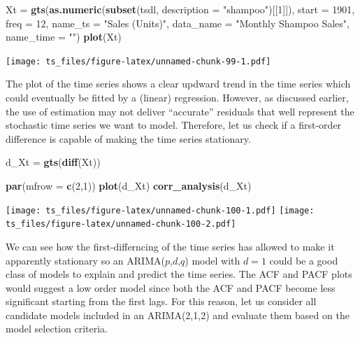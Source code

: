 \documentclass[]{book}
\newenvironment{Shaded}{\begin{snugshade}}{\end{snugshade}}
\newcommand{\KeywordTok}[1]{\textcolor[rgb]{0.13,0.29,0.53}{\textbf{#1}}}
\newcommand{\DataTypeTok}[1]{\textcolor[rgb]{0.13,0.29,0.53}{#1}}
\newcommand{\DecValTok}[1]{\textcolor[rgb]{0.00,0.00,0.81}{#1}}
\newcommand{\StringTok}[1]{\textcolor[rgb]{0.31,0.60,0.02}{#1}}
\newcommand{\NormalTok}[1]{#1}
\theoremstyle{definition}
\theoremstyle{definition}
\theoremstyle{definition}
\theoremstyle{remark}
\begin{document}
\begin{Shaded}
\begin{Highlighting}[]
\NormalTok{Xt =}\StringTok{ }\KeywordTok{gts}\NormalTok{(}\KeywordTok{as.numeric}\NormalTok{(}\KeywordTok{subset}\NormalTok{(tsdl, }\DataTypeTok{description =} \StringTok{"shampoo"}\NormalTok{)[[}\DecValTok{1}\NormalTok{]]), }\DataTypeTok{start =} \DecValTok{1901}\NormalTok{, }\DataTypeTok{freq =} \DecValTok{12}\NormalTok{, }\DataTypeTok{name_ts =} \StringTok{"Sales (Units)"}\NormalTok{, }\DataTypeTok{data_name =} \StringTok{"Monthly Shampoo Sales"}\NormalTok{, }\DataTypeTok{name_time =} \StringTok{""}\NormalTok{)}
\KeywordTok{plot}\NormalTok{(Xt)}
\end{Highlighting}
\end{Shaded}

\texttt{[image: ts\_files/figure-latex/unnamed-chunk-99-1.pdf]}

The plot of the time series shows a clear updward trend in the time
series which could eventually be fitted by a (linear) regression.
However, as discussed earlier, the use of estimation may not deliver
``accurate'' residuals that well represent the stochastic time series we
want to model. Therefore, let us check if a first-order difference is
capable of making the time series stationary.

\begin{Shaded}
\begin{Highlighting}[]
\NormalTok{d_Xt =}\StringTok{ }\KeywordTok{gts}\NormalTok{(}\KeywordTok{diff}\NormalTok{(Xt))}

\KeywordTok{par}\NormalTok{(}\DataTypeTok{mfrow =} \KeywordTok{c}\NormalTok{(}\DecValTok{2}\NormalTok{,}\DecValTok{1}\NormalTok{))}
\KeywordTok{plot}\NormalTok{(d_Xt)}
\KeywordTok{corr_analysis}\NormalTok{(d_Xt)}
\end{Highlighting}
\end{Shaded}

\texttt{[image: ts\_files/figure-latex/unnamed-chunk-100-1.pdf]}
\texttt{[image: ts\_files/figure-latex/unnamed-chunk-100-2.pdf]}

We can see how the first-differncing of the time series has allowed to
make it apparently stationary so an ARIMA(\(p\),\(d\),\(q\)) model with
\(d=1\) could be a good class of models to explain and predict the time
series. The ACF and PACF plots would suggest a low order model since
both the ACF and PACF become less significant starting from the first
lags. For this reason, let us consider all candidate models included in
an ARIMA(2,1,2) and evaluate them based on the model selection criteria.
\end{document}

